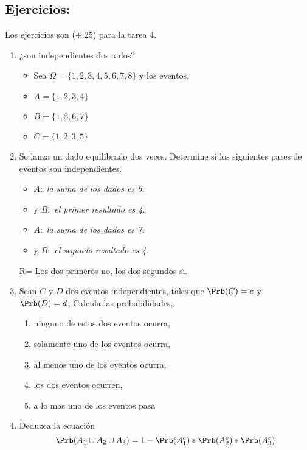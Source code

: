 \documentclass{assignment}
\begin{document}
\subsection*{Ejercicios:}
Los ejercicios son (+.25) para la tarea 4.
\begin{enumerate}
\item ¿son independientes dos a dos?
\begin{itemize}
	\item Sea $\Omega = \{ 1,2,3,4,5,6,7,8 \}$ y los eventos,
	\item $ A = \{ 1,2,3,4  \}$
	\item $ B = \{ 1,5,6,7  \}$
	\item $ C = \{ 1,2,3,5  \}$
\end{itemize}



\item Se lanza un dado equilibrado dos veces. Determine si los siguientes pares de eventos son independientes. 

\begin{itemize}
	\item $A:$ \emph{la suma de los dados es 6.}
	\item y $B:$ \emph{el primer resultado es 4.}
\end{itemize}

\begin{itemize}
	\item $A:$ \emph{la suma de los dados es 7.}
	\item y $B:$ \emph{el segundo resultado es 4.}
\end{itemize}

R= Los dos primeros no, los dos segundos si.

\item Sean $C$ y $D$ dos eventos independientes, tales que $\Prb(C)=c$ y $\Prb(D)=d$, Calcula las probabilidades,

	\begin{enumerate}
		\item ninguno de estos dos eventos ocurra,
		\item solamente uno de los eventos ocurra,
		\item al menos uno de los eventos ocurra,
		\item los dos eventos ocurren,
		\item a lo mas uno de los eventos pasa
	\end{enumerate}
	\item Deduzca la ecuación 
	\[ 
	\Prb(A_1 \cup A_2 \cup A_3)=1-\Prb(A_1^c)*\Prb(A_2^c)*\Prb(A_3^c)
	\]
\end{enumerate}
\end{document}
